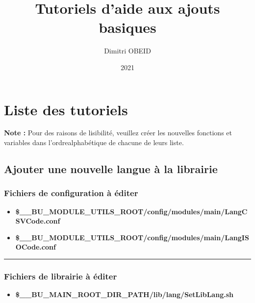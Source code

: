 \documentclass[a4paper,10pt]{article}
\title{\color{red}Tutoriels d'aide aux ajouts basiques}\color{white}
\author{Dimitri OBEID}
\date{2021}
\begin{document}
\maketitle
\newpage

\hypertarget{contents}{}
\tableofcontents
\newpage

\color{red}
\section{Liste des tutoriels}\color{white}

\textbf{Note :} Pour des raisons de lisibilité, veuillez créer les nouvelles fonctions et variables dans l'ordre\linebreak alphabétique de chacune de leurs liste.

\color{green}
\subsection{Ajouter une nouvelle langue à la librairie}\color{white}

\color{blue}
\subsubsection{Fichiers de configuration à éditer}\color{white}
\begin{itemize}
    \item \textbf{\color{orange}\$\_\_BU\_MODULE\_UTILS\_ROOT\color{lime}/config/modules/main/LangCSVCode.conf}
    \item \textbf{\color{orange}\$\_\_BU\_MODULE\_UTILS\_ROOT\color{lime}/config/modules/main/LangISOCode.conf}
\end{itemize}



\color{blue}\par\noindent\rule{\textwidth}{0.4pt}\color{white}

\color{blue}
\subsubsection{Fichiers de librairie à éditer}\color{white}
\begin{itemize}
    \item \textbf{\color{orange}\$\_\_BU\_MAIN\_ROOT\_DIR\_PATH\color{lime}/lib/lang/SetLibLang.sh}
\end{itemize}

\end{document}
